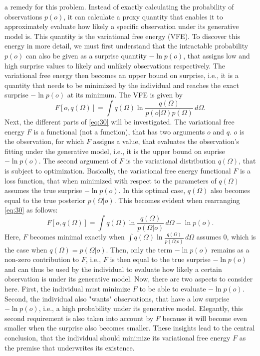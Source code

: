 a remedy for this problem. Instead of exactly calculating the probability of observations \(p(o)\), it can calculate a proxy quantity that enables it to approximately evaluate how likely a specific observation under its generative model is. This quantity is the variational free energy (VFE). To discover this energy in more detail, we must first understand that the intractable probability \(p(o)\) can also be given as a surprise quantity \(-\ln p(o)\), that assigns low and high surprise values to likely and unlikely observations respectively. The variational free energy then becomes an upper bound on surprise, i.e., it is a quantity that needs to be minimized by the individual and reaches the exact surprise \(-\ln p(o)\) at its minimum. The VFE is given by
\begin{equation}
    F[o,q(\Omega)] = \int q(\Omega) \ln \frac{q(\Omega)}{p(o|\Omega)p(\Omega)} \, d\Omega.
    \label{eq:30}
\end{equation}
Next, the different parts of \cref{eq:30} will be investigated. The variational free energy \(F\) is a functional (not a function), that has two arguments \(o\) and \(q\). \(o\) is the observation, for which \(F\) assigns a value, that evaluates the observation's fitting under the generative model, i.e., it is the upper bound on suprise \(-\ln p(o)\). The second argument of \(F\) is the variational distribution \(q(\Omega)\), that is subject to optimization. Basically, the variational free energy functional \(F\) is a loss function, that when minimized with respect to the parameters of \(q(\Omega)\) assumes the true surprise \(-\ln p(o)\). In this optimal case, \(q(\Omega)\) also becomes equal to the true posterior \(p(\Omega|o)\). This becomes evident when rearranging \cref{eq:30} as follows:
\begin{equation}
    F[o,q(\Omega)] = \int q(\Omega) \ln \frac{q(\Omega)}{p(\Omega|o)} \, d\Omega - \ln p(o).
    \label{eq:31}
\end{equation}
Here, \(F\) becomes minimal exactly when \(\int q(\Omega) \ln \frac{q(\Omega)}{p(\Omega|o)} \, d\Omega\) assumes 0, which is the case when \(q(\Omega)=p(\Omega|o)\). Then, only the term \(-\ln p(o)\) remains as a non-zero contribution to \(F\), i.e., \(F\) is then equal to the true surprise \(-\ln p(o)\) and can thus be used by the individual to evaluate how likely a certain observation is under its generative model. Now, there are two aspects to consider here. First, the individual must minimize \(F\) to be able to evaluate \(-\ln p(o)\). Second, the individual also "wants" observations, that have a low surprise \(-\ln p(o)\), i.e., a high probability under its generative model. Elegantly, this second requirement is also taken into account by \(F\) because it will become even smaller when the surprise also becomes smaller. These insights lead to the central conclusion, that the individual should minimize its variational free energy \(F\) as the premise that underwrites its existence.

